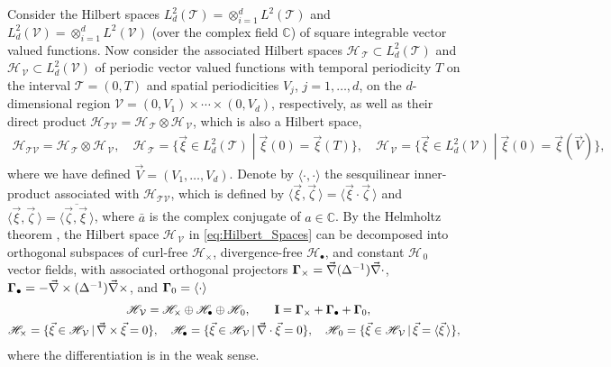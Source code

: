 \documentclass[11pt]{amsart}
\newcommand{\Ib}{\mathbf{I}}
\newcommand{\Tc}{\mathcal{T}}
\newcommand{\Vc}{\mathcal{V}}
\newcommand{\Hs}{\mathscr{H}}
\newcommand\bGamma{\mbox{\boldmath${\Gamma}$}}
\begin{document}
Consider the Hilbert spaces $L^2_d(\Tc)=\otimes_{i=1}^dL^2(\Tc)$ and
$L^2_d(\Vc)=\otimes_{i=1}^dL^2(\Vc)$ (over the complex field $\mathbb{C}$) of 
square integrable vector valued functions. Now consider the associated
Hilbert spaces $\Hs_{\,\Tc}\subset L^2_d(\Tc)$ and $\Hs_{\,\Vc}\subset L^2_d(\Vc)$
of periodic vector valued functions with temporal periodicity $T$ on
the interval $\Tc=(0,T)$ and spatial periodicities $V_j$, $j=1,\ldots,d$,
on the $d$-dimensional region $\Vc=(0,V_1)\times\cdots\times(0,V_d)$, respectively,
as well as their direct product $\Hs_{\Tc\Vc}=\Hs_{\,\Tc}\otimes\Hs_{\,\Vc}$, which
is also a Hilbert space, 
%
\begin{align}\label{eq:Hilbert_Spaces}
  \Hs_{\Tc\Vc}=\Hs_{\,\Tc}\otimes\Hs_{\,\Vc}, \quad
  \Hs_{\,\Tc}=\{ 
     \vec{\xi}\in L^2_d(\Tc)\;|\;
     \vec{\xi}(0)=\vec{\xi}(T) 
                        \}, \quad
  \Hs_{\,\Vc}=\{ 
     \vec{\xi}\in L^2_d(\Vc)\;|\;
     \vec{\xi}(0)=\vec{\xi}(\vec{V}) 
                        \}, 
\end{align}
%
where we have defined $\vec{V}=(V_1,\ldots,V_d)$. Denote by $\langle\cdot,\cdot\rangle$ the
sesquilinear inner-product associated with $\Hs_{\Tc\Vc}$, which is
defined by $\langle\vec{\xi},\vec{\zeta}\,\rangle=\langle\vec{\xi}\cdot\vec{\zeta}\,\rangle$  and
$\langle\vec{\xi},\vec{\zeta}\,\rangle=\overline{\langle\vec{\zeta},\vec{\xi}\,\rangle}$, where $\bar{a}$
is the complex conjugate of $a\in\mathbb{C}$. By the Helmholtz theorem 
\cite{Denaro:2003:0271,Bhatia:IEE:1077}, the 
Hilbert space $\Hs_{\,\Vc}$ in \eqref{eq:Hilbert_Spaces} can be
decomposed into orthogonal subspaces of curl-free $\Hs_\times$,
divergence-free $\Hs_\bullet$, and constant $\Hs_{\,0}$ vector fields, with
associated orthogonal projectors $\bGamma_\times=\vec{\nabla}(\Delta^{-1})\vec{\nabla}\cdot$, 
$\bGamma_\bullet=-\vec{\nabla}\times(\Delta^{-1})\vec{\nabla}\times$, and  $\bGamma_0=\langle\cdot\rangle$ 
\cite{Fannjiang:SIAM_JAM:333,MILTON:2002:TC}    
%
\begin{align}\label{eq:Helmholtz}
  &\Hs_{\,\Vc}=\Hs_\times\oplus\Hs_\bullet\oplus\Hs_{\,0},\qquad
  \Ib=\bGamma_\times+\bGamma_\bullet+\bGamma_0, \\  
  \Hs_\times=\{\vec{\xi}\in\Hs_{\,\Vc}\,|\,\vec{\nabla}\times\vec{\xi}&=0\}, \quad
  \Hs_\bullet
      =\{\vec{\xi}\in\Hs_{\,\Vc}\,|\,\vec{\nabla}\cdot\vec{\xi}=0\},   \quad
  \Hs_{\,0}
      =\{\vec{\xi}\in\Hs_{\,\Vc}\,|\,\vec{\xi}=\langle\vec{\xi}\,\rangle\},
     \notag  
\end{align}
%
where the differentiation is in the weak sense.
\end{document}
